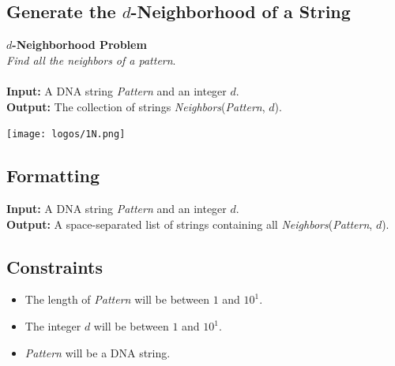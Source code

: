 \documentclass{article}
\begin{document}
\subsection{Generate the $d$-Neighborhood of a String}
\hline\vspace{5}
\noindent \textbf{$d$-Neighborhood Problem}\\
\emph{Find all the neighbors of a pattern}.\\ \\
\textbf{Input:} A DNA string \emph{Pattern} and an integer $d$.\\
\textbf{Output:} The collection of strings \emph{Neighbors}(\emph{Pattern}, $d$).
\begin{center}
    \texttt{[image: logos/1N.png]} 
\end{center}
\hline\vspace{5}

\subsection*{Formatting}
\textbf{Input:} A DNA string \emph{Pattern} and an integer $d$.\\
\noindent \textbf{Output:} A space-separated list of strings containing all \emph{Neighbors}(\emph{Pattern}, $d$).

\subsection*{Constraints}
\begin{itemize}
    \item The length of \emph{Pattern} will be between $1$ and $10^1$.
    \item The integer $d$ will be between $1$ and $10^1$.
    \item \emph{Pattern} will be a DNA string.
\end{itemize}
\pagebreak
\end{document}
